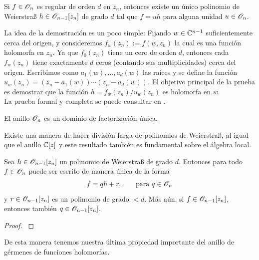 \begin{theorem}
	Si $f\in\mathscr{O}_n$ es regular de orden $d$ en $z_n$, entonces existe un único polinomio de Weierstraß $h\in\mathscr{O}_{n-1}[z_n]$ de grado $d$ tal que $f=uh$ para alguna unidad $u\in\mathscr{O}_n$.
\end{theorem}
La idea de la demostración es un poco simple: Fijando $w\in\mathbb{C}^{n-1}$ suficientemente cerca del origen, y consideremos $f_w(z_n):=f(w,z_n)$ la cual es una función holomorfa en $z_n$. Ya que $f_0(z_n)$ tiene un cero de orden $d$, entonces cada $f_w(z_n)$ tiene exactamente $d$ ceros (contando sus multiplicidades) cerca del origen. Escribimos como $a_1(w),\dots,a_d(w)$ las raíces y se define la función $u_w(z_n)=(z_n-a_1(w))\cdots(z_n-a_d(w))$. El objetivo principal de la prueba es demostrar que la función $h=f_w(z_n)/u_w(z_n)$ es holomorfa en $w$.\\
La prueba formal y completa se puede consultar en \parencite[Cap. 1, Sec, 1.1, Prop. 1.1.6]{huybrechts2005complex}.

\begin{propo}\label{anillodfu}
	El anillo $\mathscr{O}_{n}$ es un dominio de factorización única.
\end{propo}

Existe una manera de hacer división larga de polinomios de Weierstraß, al igual que el anillo $\mathbb{C}[z]$ y este resultado también es fundamental sobre el álgebra local.

\begin{theorem}
	Sea $h\in\mathscr{O}_{n-1}[z_n]$ un polinomio de Weierstraß de grado $d$. Entonces para todo $f\in\mathscr{O}_n$ puede ser escrito de manera única de la forma
	\begin{equation*}
		f=qh+r,\qquad\text{para }q\in \mathscr{O}_n 
	\end{equation*} 
	y $r\in\mathscr{O}_{n-1}[z_n]$ es un polinomio de grado $<d$. Más aún. si $f\in\mathscr{O}_{n-1}[z_n]$, entonces también $q\in\mathscr{O}_{n-1}[z_n]$.
\end{theorem}
\begin{proof}
	\parencite[Cap. 1, Sec, 1.1, Prop. 1.1.17]{huybrechts2005complex}
\end{proof}

De esta manera tenemos nuestra última propiedad importante del anillo de gérmenes de funciones holomorfas.

